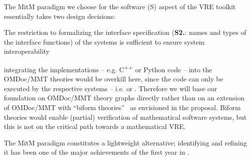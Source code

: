 The MitM paradigm we choose for the software (S) aspect of the \pn VRE toolkit essentially
takes two design decisions: 
\begin{compactenum}[\bf D1.]
\item The restriction to formalizing the interface specification (\textbf{S2.}: names and
  types of the interface functions) of the systems is sufficient to ensure system
  interoperability 
\item integrating the implementations -- e.g. C\textsuperscript{++} or Python code -- into
  the OMDoc/MMT theories would be overkill here, since the code can only be executed by
  the respective systems -- i.e. \GAP or \SageMath. Therefore we will base our foundation
  on OMDoc/MMT theory graphs directly rather than on an extension of OMDoc/MMT with
  ``biform theories''~\cite{KohManRab:aumftg13,Farmer:btc07} as envisioned in the
  proposal. Biform theories would enable (partial) verification of mathematical software
  systems, but this is not on the critical path towards a mathematical VRE.
\end{compactenum}
The MitM paradigm constitutes a lightweight alternative; identifying and refining it has
been one of the major achievements of the first year in .




